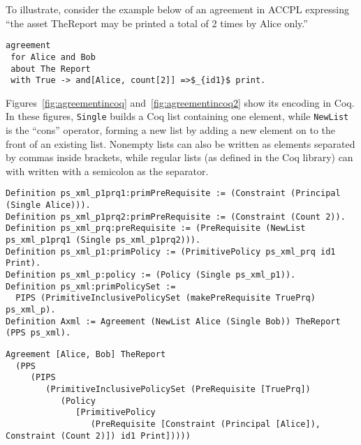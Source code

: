 \documentclass[conference]{IEEEtran}
\newcommand{\syn}{\texttt}
\begin{document}
To illustrate, consider the example below of an
agreement in ACCPL expressing ``the asset TheReport may be printed a
total of 2 times by Alice only.''
%
\lstset{language=Pucella2006, captionpos=b}
\begin{lstlisting}
agreement
 for Alice and Bob
 about The Report
 with True -> and[Alice, count[2]] =>$_{id1}$ print.
\end{lstlisting}
%
Figures~\ref{fig:agreementincoq} and~\ref{fig:agreementincoq2}
show its encoding in Coq. In these figures, \syn{Single} builds a Coq
list containing one element, while \syn{NewList} is the ``cons''
operator, forming a new list by adding a new element on to the front
of an existing list.  Nonempty lists can also be written as elements
separated by commas inside brackets, while regular lists (as defined in
the Coq library) can with written with a semicolon as the separator.

\lstset{language=Coq, captionpos=b}
\begin{figure*}
\begin{lstlisting}
Definition ps_xml_p1prq1:primPreRequisite := (Constraint (Principal (Single Alice))).
Definition ps_xml_p1prq2:primPreRequisite := (Constraint (Count 2)).
Definition ps_xml_prq:preRequisite := (PreRequisite (NewList ps_xml_p1prq1 (Single ps_xml_p1prq2))).
Definition ps_xml_p1:primPolicy := (PrimitivePolicy ps_xml_prq id1 Print).
Definition ps_xml_p:policy := (Policy (Single ps_xml_p1)).
Definition ps_xml:primPolicySet :=
  PIPS (PrimitiveInclusivePolicySet (makePreRequisite TruePrq) ps_xml_p).
Definition Axml := Agreement (NewList Alice (Single Bob)) TheReport (PPS ps_xml).
\end{lstlisting}
\caption{Coq Definitions for Example Agreement}
\label{fig:agreementincoq}
\end{figure*}

\lstset{language=Coq, captionpos=b} 
\begin{figure*}
\begin{lstlisting}
Agreement [Alice, Bob] TheReport
  (PPS
     (PIPS
        (PrimitiveInclusivePolicySet (PreRequisite [TruePrq])
           (Policy
              [PrimitivePolicy
                 (PreRequisite [Constraint (Principal [Alice]), Constraint (Count 2)]) id1 Print]))))
\end{lstlisting}
\caption{Fully Built Example Agreement in Coq}
\label{fig:agreementincoq2}
\end{figure*}
\end{document}
